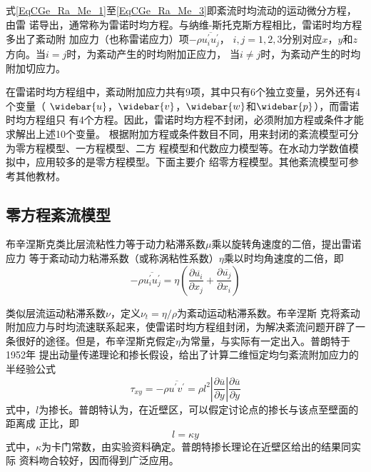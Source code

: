 式\eqref{EqCGe_Ra_Me_1}至\eqref{EqCGe_Ra_Me_3}即紊流时均流动的运动微分方程，由雷
诺导出，通常称为雷诺时均方程。与纳维-斯托克斯方程相比，雷诺时均方程多出了紊动附
加应力（也称雷诺应力）项$-\rho \overline{u^{\prime}_{i}u^{\prime}_{j}}$，
$i,j=1,2,3$分别对应$x$，$y$和$z$方向。当$i=j$时，为紊动产生的时均附加正应力，
当$i\neq j$时，为紊动产生的时均附加切应力。

在雷诺时均方程组中，紊动附加应力共有9项，其中只有6个独立变量，另外还有4个变量（
$\widebar{u}$，$\widebar{v}$，$\widebar{w}$和$\widebar{p}$），而雷诺时均方程组只
有4个方程。因此，雷诺时均方程不封闭，必须附加方程或条件才能求解出上述10个变量。
根据附加方程或条件数目不同，用来封闭的紊流模型可分为零方程模型、一方程模型、二方
程模型和代数应力模型等。在水动力学数值模拟中，应用较多的是零方程模型。下面主要介
绍零方程模型。其他紊流模型可参考其他教材。

\subsection{零方程紊流模型}
布辛涅斯克类比层流粘性力等于动力粘滞系数$\mu$乘以旋转角速度的二倍，提出雷诺应力
等于紊动动力粘滞系数（或称涡粘性系数）$\eta$乘以时均角速度的二倍，即
\begin{equation}
  -\rho \overline{u^{\prime}_{i}u^{\prime}_{j}}
  =
  \eta
  \left(
  \frac{\partial \overline{u_{i}}}{\partial x_{j}} +
  \frac{\partial \overline{u_{j}}}{\partial x_{i}}
  \right)
\end{equation}

类似层流运动粘滞系数$\nu$，定义$\nu_{t}=\eta/\rho$为紊动运动粘滞系数。布辛涅斯
克将紊动附加应力与时均流速联系起来，使雷诺时均方程组封闭，为解决紊流问题开辟了一
条很好的途径。但是，布辛涅斯克假定$\eta$为常量，与实际有一定出入。普朗特于1952年
提出动量传递理论和掺长假设，给出了计算二维恒定均匀紊流附加应力的半经验公式
\begin{equation}
  \tau_{xy}
  =
  -\rho \overline{u^{\prime}v^{\prime}}
  =
  \rho l^{2}
  \left|
  \frac{\partial \overline{u}}{\partial y}
  \right|
  \frac{\partial \overline{u}}{\partial y}
\end{equation}
式中，$l$为掺长。普朗特认为，在近壁区，可以假定讨论点的掺长与该点至壁面的距离成
正比，即
\begin{equation}
  l = \kappa y
\end{equation}
式中，$\kappa$为卡门常数，由实验资料确定。普朗特掺长理论在近壁区给出的结果同实际
资料吻合较好，因而得到广泛应用。

